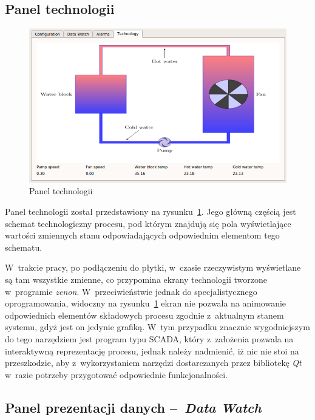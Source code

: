 \newpage
\subsection{Panel technologii}
\indent

\begin{figure}[!ht]
    \centering
    \includegraphics[width=\textwidth]{../img/technology.png}
    \caption{Panel technologii}
    \label{fig:technology}
\end{figure}

Panel technologii został przedstawiony na rysunku~\ref{fig:technology}. Jego
główną częścią jest schemat technologiczny procesu, pod którym znajdują się pola
wyświetlające wartości zmiennych stanu odpowiadających odpowiednim elementom
tego schematu.

W~trakcie pracy, po podłączeniu do płytki, w~czasie rzeczywistym wyświetlane są
tam wszystkie zmienne, co przypomina ekrany technologii tworzone w~programie
\textit{zenon}. W~przeciwieństwie jednak do specjalistycznego oprogramowania,
widoczny na rysunku~\ref{fig:technology} ekran nie pozwala na animowanie
odpowiednich elementów składowych procesu zgodnie z~aktualnym stanem systemu,
gdyż jest on jedynie grafiką. W~tym przypadku znacznie wygodniejszym do tego
narzędziem jest program typu SCADA, który z~założenia pozwala na interaktywną
reprezentację procesu, jednak należy nadmienić, iż nic nie stoi na przeszkodzie,
aby z~wykorzystaniem narzędzi dostarczanych przez bibliotekę \textit{Qt} w~razie
potrzeby przygotować odpowiednie funkcjonalności.

\newpage
\subsection{Panel prezentacji danych --~\textit{Data Watch}}
\indent

